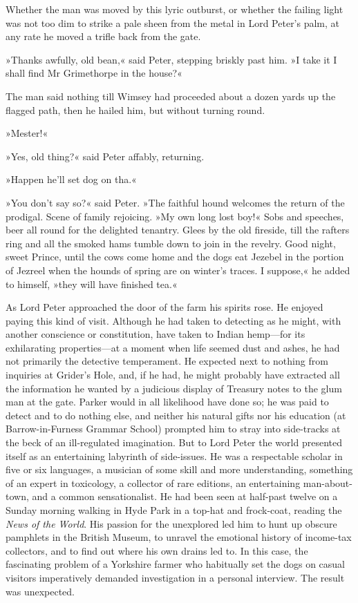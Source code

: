 Whether the man was moved by this lyric outburst, or whether the failing light was not too dim to strike a pale sheen from the metal in Lord Peter's palm, at any rate he moved a trifle back from the gate.

»Thanks awfully, old bean,« said Peter, stepping briskly past him. »I take it I shall find Mr Grimethorpe in the house?«

The man said nothing till Wimsey had proceeded about a dozen yards up the flagged path, then he hailed him, but without turning round.

»Mester!«

»Yes, old thing?« said Peter affably, returning.

»Happen he'll set dog on tha.«

»You don't say so?« said Peter. »The faithful hound welcomes the return of the prodigal. Scene of family rejoicing. »My own long lost boy!« Sobs and speeches, beer all round for the delighted tenantry. Glees by the old fireside, till the rafters ring and all the smoked hams tumble down to join in the revelry. Good night, sweet Prince, until the cows come home and the dogs eat Jezebel in the portion of Jezreel when the hounds of spring are on winter's traces. I suppose,« he added to himself, »they will have finished tea.«

As Lord Peter approached the door of the farm his spirits rose. He enjoyed paying this kind of visit. Although he had taken to detecting as he might, with another conscience or constitution, have taken to Indian hemp\allowbreak---\allowbreak for its exhilarating properties\allowbreak---\allowbreak at a moment when life seemed dust and ashes, he had not primarily the detective temperament.  He expected next to nothing from inquiries at Grider's Hole, and, if he had, he might probably have extracted all the information he wanted by a judicious display of Treasury notes to the glum man at the gate. Parker would in all likelihood have done so; he was paid to detect and to do nothing else, and neither his natural gifts nor his education (at Barrow-in-Furness Grammar School) prompted him to stray into side-tracks at the beck of an ill-regulated imagination. But to Lord Peter the world presented itself as an entertaining labyrinth of side-issues. He was a respectable scholar in five or six languages, a musician of some skill and more understanding, something of an expert in toxicology, a collector of rare editions, an entertaining man-about-town, and a common sensationalist. He had been seen at half-past twelve on a Sunday morning walking in Hyde Park in a top-hat and frock-coat, reading the \textit{News of the World}. His passion for the unexplored led him to hunt up obscure pamphlets in the British Museum, to unravel the emotional history of income-tax collectors, and to find out where his own drains led to. In this case, the fascinating problem of a Yorkshire farmer who habitually set the dogs on casual visitors imperatively demanded investigation in a personal interview. The result was unexpected.


